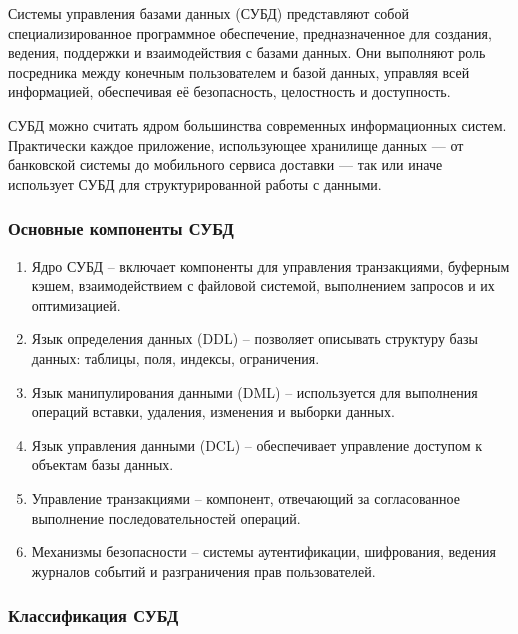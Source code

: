 Системы управления базами данных (СУБД) представляют собой специализированное программное обеспечение, предназначенное для создания, ведения, поддержки и взаимодействия с базами данных. Они выполняют роль посредника между конечным пользователем и базой данных, управляя всей информацией, обеспечивая её безопасность, целостность и доступность.

СУБД можно считать ядром большинства современных информационных систем. Практически каждое приложение, использующее хранилище данных — от банковской системы до мобильного сервиса доставки — так или иначе использует СУБД для структурированной работы с данными.

\subsubsection{Основные компоненты СУБД}

\begin{enumerate}
	\item Ядро СУБД -- включает компоненты для управления транзакциями, буферным кэшем, взаимодействием с файловой системой, выполнением запросов и их оптимизацией.
	\item Язык определения данных (DDL) -- позволяет описывать структуру базы данных: таблицы, поля, индексы, ограничения.
	\item Язык манипулирования данными (DML) -- используется для выполнения операций вставки, удаления, изменения и выборки данных.
	\item Язык управления данными (DCL) -- обеспечивает управление доступом к объектам базы данных.
	\item Управление транзакциями -- компонент, отвечающий за согласованное выполнение последовательностей операций.
	\item Механизмы безопасности -- системы аутентификации, шифрования, ведения журналов событий и разграничения прав пользователей.
\end{enumerate}

\subsubsection{Классификация СУБД}


